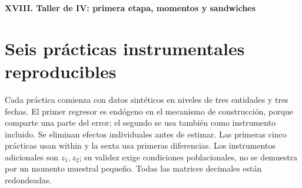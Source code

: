\documentclass[11pt,a4paper]{article}
\theoremstyle{definition}
\newcommand{\parte}[1]{\par\bigskip\Needspace{8\baselineskip}\begin{center}{\Large\bfseries\color{azul}#1}\end{center}}
\begin{document}
\parte{XVIII. Taller de IV: primera etapa, momentos y sandwiches}
\section{Seis prácticas instrumentales reproducibles}
Cada práctica comienza con datos sintéticos en niveles de tres entidades y tres fechas. El primer regresor es endógeno en el mecanismo de construcción, porque comparte una parte del error; el segundo se usa también como instrumento incluido. Se eliminan efectos individuales antes de estimar. Las primeras cinco prácticas usan within y la sexta usa primeras diferencias. Los instrumentos adicionales son $z_1,z_2$; su validez exige condiciones poblacionales, no se demuestra por un momento muestral pequeño. Todas las matrices decimales están redondeadas.
\end{document}
